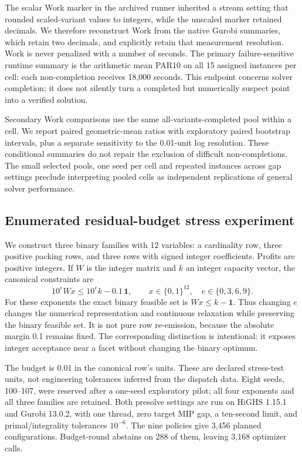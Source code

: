 \documentclass[11pt]{article}
\theoremstyle{definition}
\theoremstyle{remark}
\begin{document}
The scalar Work marker in the archived runner inherited a stream setting that rounded
scaled-variant values to integers, while the unscaled marker retained decimals. We
therefore reconstruct Work from the native Gurobi summaries, which retain two decimals,
and explicitly retain that measurement resolution. Work is never penalized with a
number of seconds. The primary failure-sensitive runtime summary is the arithmetic
mean PAR10 on all 15 assigned instances per cell: each non-completion receives 18,000
seconds. This endpoint concerns solver completion; it does not silently turn a completed
but numerically suspect point into a verified solution.

Secondary Work comparisons use the same all-variants-completed pool within a cell.
We report paired geometric-mean ratios with exploratory paired bootstrap intervals,
plus a separate sensitivity to the 0.01-unit log resolution. These conditional summaries
do not repair the exclusion of difficult non-completions. The small selected pools,
one seed per cell and repeated instances across gap settings preclude interpreting
pooled cells as independent replications of general solver performance.

\subsection{Enumerated residual-budget stress experiment}
We construct three binary families with 12 variables: a cardinality row, three positive
packing rows, and three rows with signed integer coefficients. Profits are positive
integers. If $W$ is the integer matrix and $k$ an integer capacity vector, the canonical
constraints are
\begin{equation}\label{eq:stress-family}
 10^e Wx\le 10^e k-0.1\,\boldsymbol 1,\qquad x\in\{0,1\}^{12},
 \quad e\in\{0,3,6,9\}.
\end{equation}
For these exponents the exact binary feasible set is $Wx\le k-\boldsymbol 1$.
Thus changing $e$ changes the numerical representation and continuous relaxation while
preserving the binary feasible set. It is not pure row re-emission, because the absolute
margin 0.1 remains fixed. The corresponding distinction is intentional: it exposes
integer acceptance near a facet without changing the binary optimum.

The budget is 0.01 in the canonical row's units. These are declared stress-test units,
not engineering tolerances inferred from the dispatch data. Eight seeds, 100--107, were
reserved after a one-seed exploratory pilot; all four exponents and all three families
are retained. Both presolve settings are run on HiGHS 1.15.1 and Gurobi 13.0.2, with one
thread, zero target MIP gap, a ten-second limit, and primal/integrality tolerances
$10^{-6}$. The nine policies give 3,456 planned configurations. Budget-round abstains
on 288 of them, leaving 3,168 optimizer calls.
\end{document}
